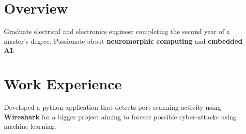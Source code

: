 \documentclass[letterpaper]{deedy-resume} %
\begin{document}
\begin{minipage}[t]{0.33\textwidth}



\end{minipage} %
\hfill
%
%
\begin{minipage}[t]{0.66\textwidth} %

\section{Overview}
\sectionspace %
Graduate electrical and electronics engineer completing the second year of a master's degree. Passionate about \textbf{neuromorphic computing} and \textbf{embedded AI}. 

\sectionspace %
\section{Work Experience}
\sectionspace %


\vspace{\topsep} %
\begin{tightitemize}
\item Developed a python application that detects port scanning activity using \textbf{Wireshark} for a bigger project aiming to foresee possible cyber-attacks using machine learning.
\end{tightitemize}

\sectionspace %



\end{minipage}
\end{document}
